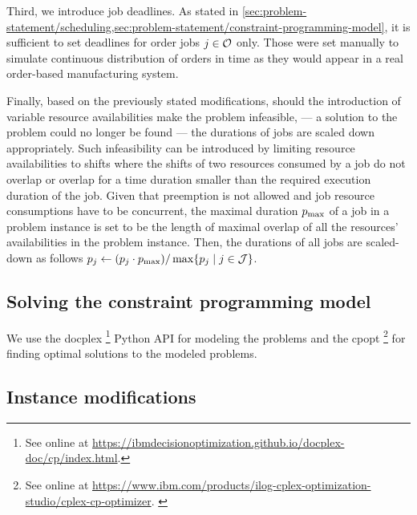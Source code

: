 Third, we introduce job deadlines.
As stated in \cref{sec:problem-statement/scheduling,sec:problem-statement/constraint-programming-model},
it is sufficient to set deadlines for order jobs $j \in \mathcal{O}$ only.
Those were set manually to simulate continuous distribution of orders in time
as they would appear in a real order-based manufacturing system.

Finally, based on the previously stated modifications,
should the introduction of variable resource availabilities make the problem infeasible,
--- a solution to the problem could no longer be found ---
the durations of jobs are scaled down appropriately.
Such infeasibility can be introduced by limiting resource availabilities to shifts
where the shifts of two resources consumed by a job do not overlap
or overlap for a time duration smaller than the required execution duration of the job.
Given that preemption is not allowed and job resource consumptions have to be concurrent,
the maximal duration $p_{\text{max}}$ of a job in a problem instance is set to be the length of maximal overlap
of all the resources' availabilities in the problem instance.
Then, the durations of all jobs are scaled-down as follows
$p_{j} \gets (p_{j} \cdot p_{\text{max}}) / \max\{p_{j} \;|\; j \in \mathcal{J} \}$.


\subsection{Solving the constraint programming model} \label{subsec:numerical-experiments/setup/solving-cp-model}

We use the \ac{docplex}%
\footnote{See online at \url{https://ibmdecisionoptimization.github.io/docplex-doc/cp/index.html}.}
Python API for modeling the problems
and the \ac{cpopt}%
\footnote{See online at \url{https://www.ibm.com/products/ilog-cplex-optimization-studio/cplex-cp-optimizer}. \citep{WEB_IBM_CPLEX}}
for finding optimal solutions to the modeled problems.


\subsection{Instance modifications} \label{subsec:numerical-experiments/setup/instance-modifications}

